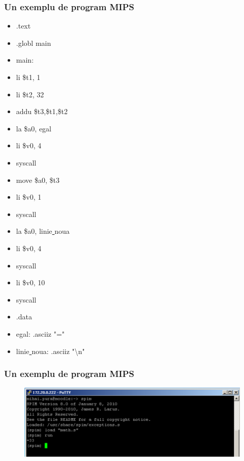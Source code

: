 \documentclass[pdf]{beamer}
\begin{document}
\begin{frame}[shrink=20]
\frametitle{Un exemplu de program MIPS}
\begin{itemize}
\item \qquad
	.text
\item \qquad
	.globl main
\item 	
main:
\item \qquad
	li \hspace{10mm} \$t1, 1
\item \qquad
	li \hspace{10mm}	\$t2, 32
\item \qquad
	addu \hspace{4mm} \$t3,\$t1,\$t2
\item \qquad
	la \hspace{9mm}	\$a0, egal
\item \qquad
	li \hspace{10mm}	\$v0, 4
\item \qquad
	syscall
\item \qquad
	move \hspace{3mm} \$a0, \$t3
\item \qquad
	li \hspace{10mm}	\$v0, 1
\item \qquad
	syscall
\item \qquad
	la \hspace{9mm}	\$a0, linie\underline{ }noua
\item \qquad
	li \hspace{10mm}	\$v0, 4
\item \qquad
	syscall
\item \qquad
	li \hspace{10mm}	\$v0, 10
\item \qquad
	syscall
\item \qquad
	.data
\item
egal:	\hspace{11mm}	.asciiz \qquad	"="
\item
linie\underline{ }noua: \hspace{2mm} .asciiz \qquad	"\textbackslash{n}"
\end{itemize}
\end{frame}



\begin{frame}
\frametitle{Un exemplu de program MIPS}
\begin{figure}
\includegraphics[width=\linewidth]{poza6.png} 
\end{figure}
\end{frame}
\end{document}
